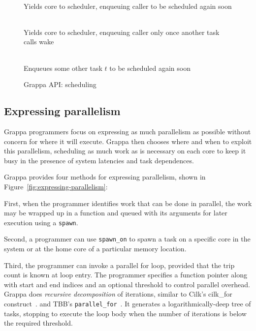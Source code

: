 \begin{figure}[htbp]
  \begin{center}
    \begin{description}\small
    \item[ \texttt{ yield() } ] \hfill \\
      Yields core to scheduler, enqueuing caller to be scheduled again soon
    \item[ \texttt{ suspend() } ] \hfill \\
      Yields core to scheduler, enqueuing caller only once another task calls wake
    \item[ \texttt{ wake( task * $t$ ) } ] \hfill \\
      Enqueues some other task $t$ to be scheduled again soon
    \end{description}
    \begin{minipage}{0.95\columnwidth}
      \caption{\label{fig:scheduling} Grappa API: scheduling} %
    \end{minipage}
  \end{center}
\end{figure}


\subsection{Expressing parallelism}

Grappa programmers focus on expressing as much
parallelism as possible without concern for where it will execute.
Grappa then chooses where and when to exploit this parallelism,
scheduling as much work as is necessary on each core to keep it busy
in the presence of system latencies and task dependences.

Grappa provides four methods for expressing parallelism, shown in
Figure~\ref{fig:expressing-parallelism}:

First, when the programmer identifies work
that can be done in parallel, the work may be wrapped up in a function
and queued with its arguments for later execution using a
\texttt{spawn}.

Second, a programmer can use \texttt{spawn\_on} to spawn a task on a
specific core in the system or at the home core of a particular memory
location.

Third, the programmer can invoke a parallel for loop, provided that
the trip count is known at loop entry. The programmer
specifies a function pointer along with start and end indices and an
optional threshold to control parallel overhead. Grappa does {\em
recursive decomposition} of iterations, similar to Cilk's cilk\_for
construct~\cite {cilkforimplementation}. and TBB's {\tt parallel\_for}~\cite{intel_tbb}.  It generates a
logarithmically-deep tree of tasks, stopping to execute the loop body
when the number of iterations is below the required threshold.

